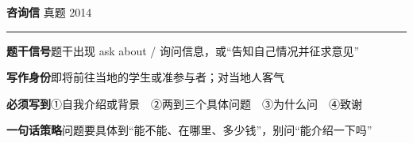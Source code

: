 \documentclass[11pt,a4paper]{ctexart}
\begin{document}
\clearpage
{}\label{g09}
\noindent{\color{accent}\rule{\linewidth}{1.5pt}}\par\vspace{3pt}
\hspace{6pt}
{\LARGE\bfseries 咨询信}\hfill
{\footnotesize\color{gray} 真题 2014}\par
\vspace{1pt}
{\color{accent!35}\rule{\linewidth}{0.5pt}}\par\vspace{3pt}
{\footnotesize {\color{accent}\bfseries 题干信号}\quad 题干出现 ask about / 询问信息，或“告知自己情况并征求意见”}\par
{\footnotesize {\color{accent}\bfseries 写作身份}\quad 即将前往当地的学生或准参与者；对当地人客气}\par
{\footnotesize {\color{accent}\bfseries 必须写到}\quad ①自我介绍或背景　②两到三个具体问题　③为什么问　④致谢}\par
{\footnotesize {\color{accent}\bfseries 一句话策略}\quad 问题要具体到“能不能、在哪里、多少钱”，别问“能介绍一下吗”}\par
\end{document}

